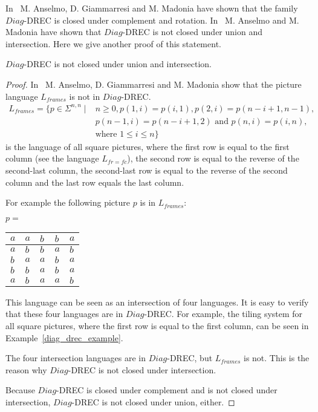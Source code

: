 In~\cite{anselmo2007determinism} M. Anselmo, D. Giammarresi and M. Madonia have shown that the
family $Diag$-DREC is closed under complement and rotation. In~\cite{anselmo2009deterministic}
M. Anselmo and M. Madonia have shown that $Diag$-DREC is not closed under union and intersection.
Here we give another proof of this statement.
\begin{theorem}
$Diag$-DREC is not closed under union and intersection.
\label{diag_drec_not_closed_under_union_and_intersection}
\end{theorem} 
\begin{proof}
In~\cite{anselmo2007determinism} M. Anselmo, D. Giammarresi and M. Madonia show that the
picture language $L_{frames}$ is not in $Diag$-DREC. 
\begin{align*}
L_{frames} = \{p \in \Sigma^{n,n} \mid& n\geq 0, p(1, i) = p(i, 1), p(2, i) = p(n - i + 1, n - 1),\\
&p(n -1, i) = p(n - i + 1, 2) \text{ and } p(n, i) = p(i, n),\\
&\text{where } 1 \leq i \leq n\}
\end{align*}
is the language of all square pictures, where the first row is equal to the first column (see the
language $L_{fr=fc}$), the second row is equal to the reverse of the second-last column, the
second-last row is equal to the reverse of the second column and the last row equals the last
column.

For example the following picture $p$ is in $L_{frames}$:
\begin{center}
$p = $ \begin{tabular}{|C{0.65cm}|C{0.65cm}|C{0.65cm}|C{0.65cm}|C{0.65cm}|}
\hline
 $a$ & $a$ & $b$ & $b$ & $a$ \tabularnewline
\hline
 $a$ & $b$ & $b$ & $a$ & $b$ \tabularnewline
\hline
 $b$ & $a$ & $a$ & $b$ & $a$ \tabularnewline
\hline
 $b$ & $b$ & $a$ & $b$ & $a$ \tabularnewline
\hline
 $a$ & $b$ & $a$ & $a$ & $b$ \tabularnewline
\hline
\end{tabular}
\end{center}
This language can be seen as an intersection of four languages. It is easy to verify that these four
languages are in $Diag$-DREC. For example, the tiling system for all square pictures, where the
first row is equal to the first column, can be seen in Example~\ref{diag_drec_example}.

The four intersection languages are in $Diag$-DREC, but $L_{frames}$ is not. This is the reason why
$Diag$-DREC is not closed under intersection.

Because $Diag$-DREC is closed under complement and is not closed under intersection, $Diag$-DREC is
not closed under union, either.
\end{proof} 